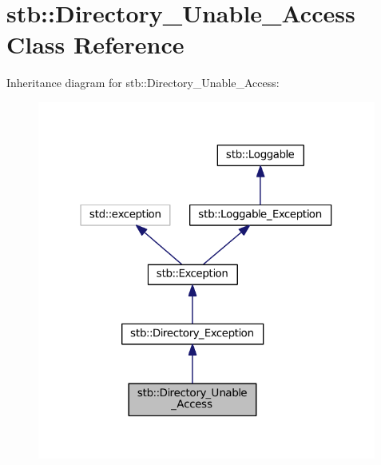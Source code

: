 \hypertarget{classstb_1_1Directory__Unable__Access}{\section{stb\+:\+:Directory\+\_\+\+Unable\+\_\+\+Access Class Reference}
\label{classstb_1_1Directory__Unable__Access}
}


Inheritance diagram for stb\+:\+:Directory\+\_\+\+Unable\+\_\+\+Access\+:
\nopagebreak
\begin{figure}[H]
\begin{center}
\leavevmode
\includegraphics[width=316pt]{classstb_1_1Directory__Unable__Access__inherit__graph}
\end{center}
\end{figure}


